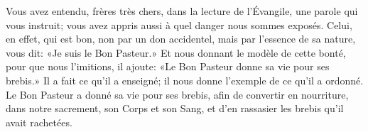 Vous avez entendu, frères très chers, dans la lecture de l’Évangile,
	une parole qui vous instruit;
	vous avez appris aussi à quel danger nous sommes exposés.
Celui, en effet, qui est bon,
	non par un don accidentel, mais par l’essence de sa nature,
	vous dit: «Je suis le Bon Pasteur.»
Et nous donnant le modèle de cette bonté, pour que nous l’imitions,
	il ajoute: «Le Bon Pasteur donne sa vie pour ses brebis.»
Il a fait ce qu’il a enseigné;
	il nous donne l’exemple de ce qu’il a ordonné.
Le Bon Pasteur a donné sa vie pour ses brebis,
	afin de convertir en nourriture, dans notre sacrement,
		son Corps et son Sang,
	et d’en rassasier les brebis qu’il avait rachetées.
